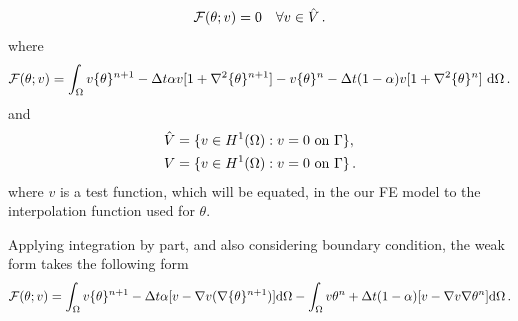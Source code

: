 \documentclass[]{article}
\begin{document}
\begin{equation}\label{eq7}
	\begin{aligned}
		\mathcal{F}(\theta;v) = 0 \quad \forall v \in \hat{V}\thinspace.
	\end{aligned}
\end{equation}
where
\begin{equation}\label{eq8}
	\begin{aligned}
		\mathcal{F}(\theta; v) =\int_{\Omega} v\{\theta\}^{n+1} -\Delta t\alpha v[1+\nabla^2\{ \theta\}^{n+1}] - v\{\theta\}^n - \Delta t(1 - \alpha)v[1+\nabla^2\{\theta\}^{n}]\ \mathrm{d}\Omega \thinspace .
	\end{aligned}
\end{equation}
and
\begin{equation}\label{eq9}
	\begin{aligned}
		\hat{V} &= \{v \in H^1(\Omega) : v = 0 \text{ on } \Gamma\}, \\
		V &= \{v \in H^1(\Omega) : v = 0 \text{ on } \Gamma\}\thinspace.
	\end{aligned}
\end{equation}
where $v$ is a test function, which will be equated, in the our FE model to the interpolation function used for $\theta$.

Applying integration by part, and also considering boundary condition, the weak form takes the following form
\begin{equation}\label{eq10}
	\begin{aligned}
		\mathcal{F}(\theta; v)=\int_{\Omega} v\{\theta\}^{n+1} - \Delta t \alpha [v - \nabla v (\nabla \{\theta\}^{n+1})] \mathrm{d} \Omega - \int_{\Omega} v\theta^{n} + \Delta t (1-\alpha) [v -\nabla v \nabla\theta^n ] \mathrm{d} \Omega\thinspace.
	\end{aligned}
\end{equation}
\end{document}
